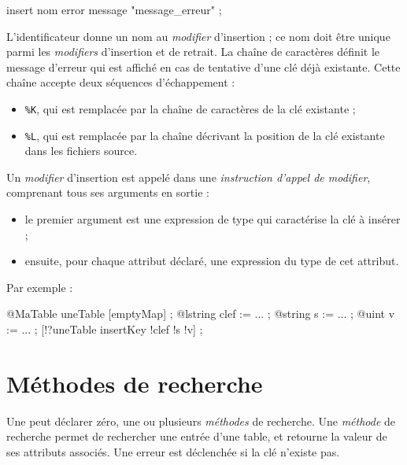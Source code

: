 \begin{galgascode}
insert nom error message "message_erreur" ;
\end{galgascode}

L'identificateur  donne un nom au \emph{modifier} d'insertion ; ce nom doit être unique parmi les \emph{modifiers} d'insertion et de retrait. La chaîne de caractères  définit le message d'erreur qui est affiché en cas de tentative d'une clé déjà existante. Cette chaîne accepte deux séquences d'échappement :
\begin{itemize}
  \item \colorbox{\couleurCodeGALGAS}{\texttt{\%K}}, qui est remplacée par la chaîne de caractères de la clé existante ;
  \item \colorbox{\couleurCodeGALGAS}{\texttt{\%L}}, qui est remplacée par la chaîne décrivant la position de la clé existante dans les fichiers source.
\end{itemize}


Un \emph{modifier} d'insertion est appelé dans une \emph{instruction d'appel de modifier}, comprenant tous ses arguments en sortie :
\begin{itemize}
  \item le premier argument est une expression de type  qui caractérise la clé à insérer ;
  \item ensuite, pour chaque attribut déclaré, une expression du type de cet attribut.
\end{itemize}

Par exemple :
\begin{galgascode}
@MaTable uneTable [emptyMap] ;
@lstring clef := ... ;
@string s := ... ;
@uint v := ... ;
[!?uneTable insertKey !clef !s !v] ;
\end{galgascode}











\section{Méthodes de recherche}

Une  peut déclarer zéro, une ou plusieurs \emph{méthodes} de recherche. Une \emph{méthode} de recherche permet de rechercher une entrée d'une table, et retourne la valeur de ses attributs associés. Une erreur est déclenchée si la clé n'existe pas.


